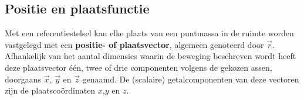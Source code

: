 \documentclass{ximera}
\begin{document}
	\author{Bart Lambregs, Vincent Gellens}
    \xmsource\xmuitleg







\subsection*{Positie en plaatsfunctie}

Met een referentiestelsel kan elke plaats van een puntmassa in de ruimte worden vastgelegd met een \textbf{positie- of plaatsvector}, algemeen genoteerd door \(\vec{r}\).
Afhankelijk van het aantal dimensies waarin de beweging beschreven wordt heeft deze plaatsvector één, twee of drie componenten volgens de gekozen assen, doorgaans \(\vec{x}\), \(\vec{y}\) en \(\vec{z}\) genaamd.
De (scalaire) getalcomponenten van deze vectoren zijn de plaatscoördinaten \(x\),\(y\) en \(z\).


\begin{image}
\end{image}
  
\end{document}

